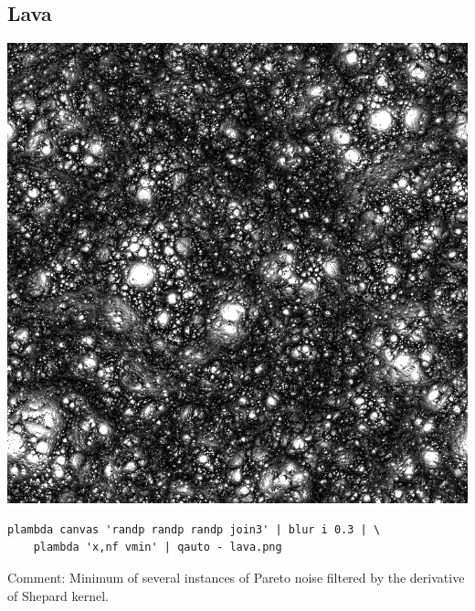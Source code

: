 \subsection{Lava}
\includegraphics{lava.png}
\begin{verbatim}
plambda canvas 'randp randp randp join3' | blur i 0.3 | \
	plambda 'x,nf vmin' | qauto - lava.png
\end{verbatim}
Comment: Minimum of several instances of Pareto noise filtered by the
derivative of Shepard kernel.

